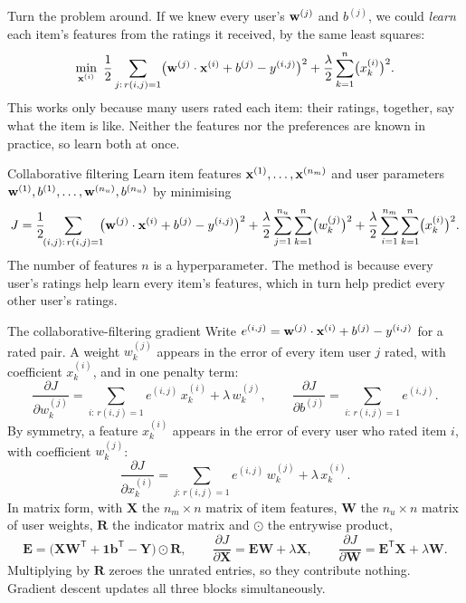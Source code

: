 Turn the problem around. If we knew every user's $\mathbf{w}^{(j)}$ and $b^{(j)}$, we
could \emph{learn} each item's features from the ratings it received, by the
same least squares:
\[
  \min_{\vx^{(i)}}\ \frac12\sum_{j:\,r(i,j)=1}\bigl(\vw^{(j)}\cdot\vx^{(i)} + b^{(j)} - y^{(i,j)}\bigr)^2
    + \frac{\lambda}{2}\sum_{k=1}^{n}\bigl(x^{(i)}_k\bigr)^2 .
\]
This works only because many users rated each item: their ratings, together,
say what the item is like. Neither the features nor the preferences are known in
practice, so learn both at once.

\begin{defbox}{Collaborative filtering}
Learn item features $\mathbf{x}^{(1)},\dots,\mathbf{x}^{(n_m)}$ and user parameters
$\mathbf{w}^{(1)},b^{(1)},\dots,\mathbf{w}^{(n_u)},b^{(n_u)}$ by minimising
\[
  J = \frac12\!\!\sum_{(i,j):\,r(i,j)=1}\!\!\bigl(\mathbf{w}^{(j)}\cdot\mathbf{x}^{(i)} + b^{(j)} - y^{(i,j)}\bigr)^2
    + \frac{\lambda}{2}\sum_{j=1}^{n_u}\sum_{k=1}^{n}\bigl(w^{(j)}_k\bigr)^2
    + \frac{\lambda}{2}\sum_{i=1}^{n_m}\sum_{k=1}^{n}\bigl(x^{(i)}_k\bigr)^2 .
\]
The number of features $n$ is a hyperparameter. The method is
 because every user's ratings help learn every item's
features, which in turn help predict every other user's ratings.
\end{defbox}

\begin{derivation}{The collaborative-filtering gradient}
Write $e^{(i,j)} = \mathbf{w}^{(j)}\cdot\mathbf{x}^{(i)} + b^{(j)} - y^{(i,j)}$ for a rated pair.
A weight $w^{(j)}_k$ appears in the error of every item user $j$ rated, with
coefficient $x^{(i)}_k$, and in one penalty term:
\[
  \frac{\partial J}{\partial w^{(j)}_k} = \sum_{i:\,r(i,j)=1} e^{(i,j)}\,x^{(i)}_k + \lambda\,w^{(j)}_k ,
  \qquad
  \frac{\partial J}{\partial b^{(j)}} = \sum_{i:\,r(i,j)=1} e^{(i,j)} .
\]
By symmetry, a feature $x^{(i)}_k$ appears in the error of every user who rated
item $i$, with coefficient $w^{(j)}_k$:
\[
  \frac{\partial J}{\partial x^{(i)}_k} = \sum_{j:\,r(i,j)=1} e^{(i,j)}\,w^{(j)}_k + \lambda\,x^{(i)}_k .
\]
In matrix form, with $\mathbf{X}$ the $n_m\times n$ matrix of item features,
$\mathbf{W}$ the $n_u\times n$ matrix of user weights, $\mathbf{R}$ the
indicator matrix and $\odot$ the entrywise product,
\[
  \mathbf{E} = \bigl(\mathbf{X}\mathbf{W}^{\mathsf T} + \mathbf{1}\mathbf{b}^{\mathsf T} - \mathbf{Y}\bigr)\odot\mathbf{R},
  \qquad
  \frac{\partial J}{\partial\mathbf{X}} = \mathbf{E}\mathbf{W} + \lambda\mathbf{X},
  \qquad
  \frac{\partial J}{\partial\mathbf{W}} = \mathbf{E}^{\mathsf T}\mathbf{X} + \lambda\mathbf{W} .
\]
Multiplying by $\mathbf{R}$ zeroes the unrated entries, so they contribute
nothing. Gradient descent updates all three blocks simultaneously.
\end{derivation}

